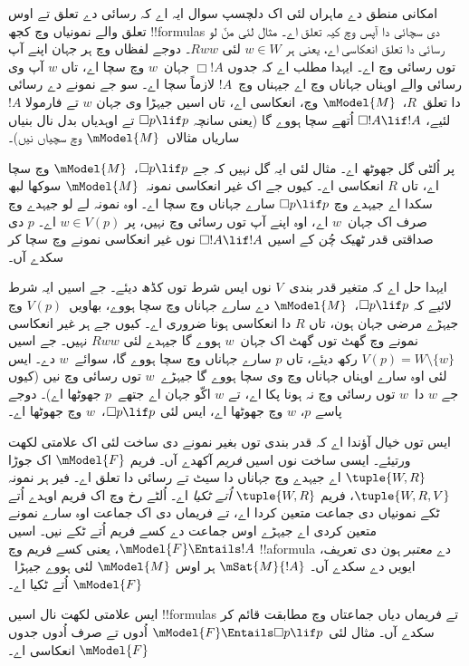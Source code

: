 \documentclass[../../../include/open-logic-section]{subfiles}
\begin{document}


امکانی منطق دے ماہراں لئی اک دلچسپ سوال ایہ اے کہ رسائی دے تعلق تے اوس تعلق والے نمونیاں وچ کجھ !!{formula}s دی سچائی دا آپس وچ کیہ تعلق اے۔ مثال لئی منّ لو رسائی دا تعلق انعکاسی اے، یعنی ہر $w
\in W$ لئی $Rww$۔ دوجے لفظاں وچ ہر جہان اپنے آپ توں رسائی وچ اے۔ ایہدا مطلب اے کہ جدوں $\Box !A$ جہان~$w$ وچ سچا اے، تاں $w$ آپ وی رسائی والے اوہناں جہاناں وچ اے جیہناں وچ~$!A$ لازماً سچا اے۔ سو جے نمونے دے رسائی دا تعلق~$R$،~$\mModel{M}$ وچ، انعکاسی اے، تاں اسیں جیہڑا وی جہان $w$ تے فارمولا $!A$ لئیے، $\Box !A
\lif !A$ اُتھے سچا ہووے گا (یعنی سانچہ $\Box p \lif
p$ تے اوہدیاں بدل نال بنیاں ساریاں مثالاں~$\mModel{M}$ وچ سچیاں نیں)۔

پر اُلٹی گل جھوٹھ اے۔ مثال لئی ایہ گل نہیں کہ جے
$\Box p \lif p$،~$\mModel{M}$ وچ سچا اے، تاں $R$ انعکاسی اے۔ کیوں جے اک غیر انعکاسی نمونہ~$\mModel{M}$ سوکھا لبھ سکدا اے جیہدے وچ $\Box p \lif
p$ سارے جہاناں وچ سچا اے۔ اوہ نمونہ لے لو جیہدے وچ صرف اک جہان~$w$ اے، اوہ اپنے آپ توں رسائی وچ نہیں، پر $w \in V(p)$ اے۔ $p$ دی صداقتی قدر ٹھیک چُن کے اسیں $\Box !A \lif !A$ نوں غیر انعکاسی نمونے وچ سچا کر سکدے آں۔

ایہدا حل اے کہ متغیر قدر بندی~$V$ نوں ایس شرط توں کڈھ دیئے۔ جے اسیں ایہ شرط لائیے کہ $\Box p \lif p$،~$\mModel{M}$ دے سارے جہاناں وچ سچا ہووے، بھاویں~$V(p)$ وچ جیہڑے مرضی جہان ہون، تاں $R$ دا انعکاسی ہونا ضروری اے۔ کیوں جے ہر غیر انعکاسی نمونے وچ گھٹ توں گھٹ اک جہان~$w$ ہووے گا جیہدے لئی $Rww$ نہیں۔ جے اسیں $V(p) =
W \setminus \{w\}$ رکھ دیئے، تاں $p$ سارے جہاناں وچ سچا ہووے گا، سوائے~$w$ دے۔ ایس لئی اوہ سارے اوہناں جہاناں وچ وی سچا ہووے گا جیہڑے~$w$ توں رسائی وچ نیں (کیوں جے $w$ دا~$w$ توں رسائی وچ نہ ہونا پکا اے، تے $w$ اکّو جہان اے جتھے~$p$ جھوٹھا اے)۔ دوجے پاسے $p$، $w$ وچ جھوٹھا اے، ایس لئی $\Box
p \lif p$،~$w$ وچ جھوٹھا اے۔

ایس توں خیال آؤندا اے کہ قدر بندی توں بغیر نمونے دی ساخت لئی اک علامتی لکھت ورتیئے۔ ایسی ساخت نوں اسیں \emph{فریم} آکھدے آں۔ فریم $\mModel{F}$ اک جوڑا $\tuple{W, R}$ اے جیہدے وچ جہاناں دا سیٹ تے رسائی دا تعلق اے۔ فیر ہر نمونہ $\tuple{W, R, V}$، فریم $\tuple{W, R}$ \emph{اُتے ٹکیا} اے۔ اُلٹے رخ وچ اک فریم اوہدے اُتے ٹکے نمونیاں دی جماعت متعین کردا اے، تے فریماں دی اک جماعت اوہ سارے نمونے متعین کردی اے جیہڑے اوس جماعت دے کسے فریم اُتے ٹکے نیں۔ اسیں $\mModel{F} \Entails !A$، یعنی کسے فریم وچ !!a{formula} دے \emph{معتبر} ہون دی تعریف، ایویں دے سکدے آں۔ $\mSat{M}{!A}$ ہر اوس $\mModel{M}$ لئی ہووے جیہڑا~$\mModel{F}$ اُتے ٹکیا اے۔

ایس علامتی لکھت نال اسیں !!{formula}s تے فریماں دیاں جماعتاں وچ مطابقت قائم کر سکدے آں۔ مثال لئی $\mModel{F} \Entails \Box p \lif p$ اُدوں تے صرف اُدوں جدوں $\mModel{F}$ انعکاسی اے۔
\end{document}
